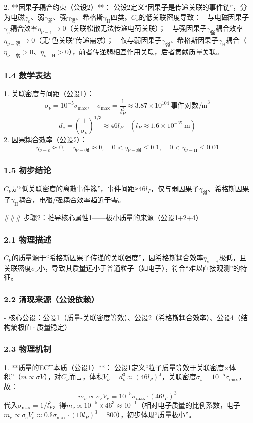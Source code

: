 \documentclass{article}
\begin{document}
2. **因果子耦合约束（公设2）**：  
   公设2定义“因果子是传递关联的事件链”，分为电磁\(\gamma_e\)、弱\(\gamma_{\text{弱}}\)、强\(\gamma_{\text{强}}\)、希格斯\(\gamma_{\text{H}}\)四类。\(C_{\nu}\)的低关联密度导致：  
   - 与电磁因果子\(\gamma_e\)耦合效率\(\eta_{\nu-e} \to 0\)（关联松散无法传递电荷关联）；  
   - 与强因果子\(\gamma_{\text{强}}\)耦合效率\(\eta_{\nu-\text{强}} \to 0\)（无“色关联”传递需求）；  
   - 仅与弱因果子\(\gamma_{\text{弱}}\)、希格斯因果子\(\gamma_{\text{H}}\)耦合（\(\eta_{\nu-\text{弱}} > 0\)、\(\eta_{\nu-\text{H}} > 0\)），前者传递弱相互作用关联，后者贡献质量关联。

\subsubsection{1.4 数学表达}
1. 关联密度与间距（公设1）：  
   \[
   \sigma_{\nu} = 10^{-5}\sigma_{\text{max}}, \quad \sigma_{\text{max}} = \frac{1}{l_P^3} \approx 3.87×10^{104}\ \text{事件对数/m}^3
   \]
   \[
   d_{\nu} = \left( \frac{1}{\sigma_{\nu}} \right)^{1/3} \approx 46l_P \quad (l_P \approx 1.6×10^{-35}\ \text{m})
   \]
2. 因果耦合效率（公设2）：  
   \[
   \eta_{\nu-e} \approx 0, \quad \eta_{\nu-\text{强}} \approx 0, \quad 0 < \eta_{\nu-\text{弱}} \leq 0.1, \quad 0 < \eta_{\nu-\text{H}} \leq 0.01
   \]

\subsubsection{1.5 初步结论}
\(C_{\nu}\)是“低关联密度的离散事件簇”，事件间距≈46\(l_P\)，仅与弱因果子\(\gamma_{\text{弱}}\)、希格斯因果子\(\gamma_{\text{H}}\)耦合，电磁/强耦合效率趋近于零。


### 步骤2：推导核心属性1——极小质量的来源（公设1+2+4）
\subsubsection{2.1 物理描述}
\(C_{\nu}\)的质量源于“希格斯因果子传递的关联强度”，因希格斯耦合效率\(\eta_{\nu-\text{H}}\)极低，且关联密度\(\sigma_{\nu}\)小，导致其质量远小于普通粒子（如电子），符合“难以直接观测”的特征。

\subsubsection{2.2 涌现来源（公设依赖）}
- 核心公设：公设1（质量-关联密度等效）、公设2（希格斯耦合效率）、公设4（结构熵极值·质量稳定）

\subsubsection{2.3 物理机制}
1. **质量的ECT本质（公设1）**：  
   公设1定义“粒子质量等效于关联密度×体积”（\(m \propto \sigma V\)），对\(C_{\nu}\)而言，体积\(V_{\nu} = d_{\nu}^3 \approx (46l_P)^3\)，关联密度\(\sigma_{\nu} = 10^{-5}\sigma_{\text{max}}\)，故：  
   \[
   m_{\nu} \propto \sigma_{\nu} V_{\nu} = 10^{-5}\sigma_{\text{max}} \cdot (46l_P)^3
   \]
   代入\(\sigma_{\text{max}} = 1/l_P^3\)，得\(m_{\nu} \propto 10^{-5} \times 46^3 \approx 10^{-1}\)（相对电子质量的比例系数，电子\(m_e \propto \sigma_e V_e \approx 0.8\sigma_{\text{max}} \cdot (10l_P)^3 = 800\)），初步体现“质量极小”。
\end{document}
